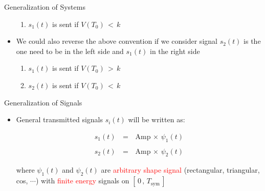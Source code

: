 \documentclass{Beamer}
\begin{document}
\begin{frame}[t,allowframebreaks]{Generalization of Systems}
\begin{itemize}
\begin{enumerate}
	\item $s_1(t)$ is sent if $V(T_0) \, < \, k$ 
	\end{enumerate}

\item We could also reverse the above convention if we consider signal $s_2(t)$ is the one need to be in the left side and $s_1(t)$ in the right side

	\begin{enumerate}
	\item $s_1(t)$ is sent if $V(T_0) \, > \, k$
	
	\item $s_2(t)$ is sent if $V(T_0) \, < \, k$ 
	\end{enumerate}

\end{itemize}

\end{frame}

\begin{frame}[t]{Generalization of Signals}

\begin{itemize}

\item General transmitted signals $s_i(t)$ will be written as:

\begin{equation}
\begin{array}{rcl}
s_1(t) \, &=& \,\text{Amp} \, \times \, \psi_1(t) \\ \\
s_2(t) \, &=& \,\text{Amp} \, \times \, \psi_2(t)
\end{array}
\end{equation}

where $\psi_1(t)$ and $\psi_2(t)$ are \textcolor{red}{arbitrary shape signal} (rectangular, triangular, cos, $\cdots$) with \textcolor{red}{finite energy} signals on $[\, 0 \, , \,T_{\text{sym}} \,]$

\end{itemize}

\end{frame}
\end{document}

